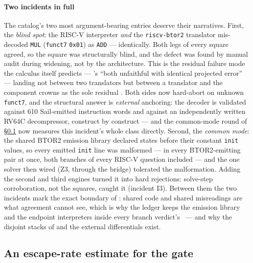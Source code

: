\paragraph{Two incidents in full}
The catalog's two most argument-bearing entries deserve their
narratives. First, the \emph{blind spot}: the RISC-V interpreter
\emph{and} the \texttt{riscv-btor2} translator mis-decoded
\texttt{MUL} (\texttt{funct7} \texttt{0x01}) as \texttt{ADD} ---
identically. Both legs of every square agreed, so the square was
structurally blind, and the defect was found by manual audit during
widening, not by the architecture. This is the residual failure mode
the calculus itself predicts --- 's ``both unfaithful
with identical projected error'' --- landing not between two
translators but between a translator and the component
 crowns as the sole residual \tcb. Both sides
now hard-abort on unknown \texttt{funct7}, and the structural answer
is \emph{external} anchoring: the decoder is validated against 610
Sail-emitted instruction words and against an independently written
RV64C decompressor, construct by construct --- and the common-mode
round of \S\ref{sec:eval-escape} now measures this incident's whole
class directly. Second, the \emph{common
mode}: the shared BTOR2 emission library declared states before their
constant \texttt{init} values, so every emitted \texttt{init} line
was malformed --- in every BTOR2-emitting pair at once, both branches
of every RISC-V question included --- and the one solver then wired
(Z3, through the bridge) tolerated the malformation. Adding the
second and third engines turned it into hard rejections: solve-step
corroboration, not the squares, caught it (incident I3). Between them
the two incidents mark the exact boundary of :
shared code and shared misreadings are what agreement cannot see,
which is why the ledger keeps the emission library and the endpoint
interpreters inside every branch verdict's \tcb\ --- and why the
disjoint stacks of  and the external differentials
exist.

\subsection{An escape-rate estimate for the gate}
\label{sec:eval-escape}





